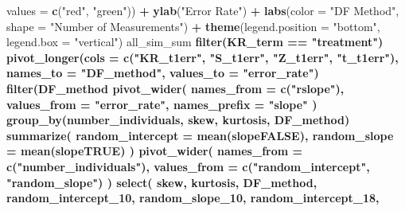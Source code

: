 \documentclass[12pt, twoside]{amherstthesis}
\newenvironment{Shaded}{\begin{snugshade}}{\end{snugshade}}
\newcommand{\DataTypeTok}[1]{\textcolor[rgb]{0.13,0.29,0.53}{#1}}
\newcommand{\DecValTok}[1]{\textcolor[rgb]{0.00,0.00,0.81}{#1}}
\newcommand{\KeywordTok}[1]{\textcolor[rgb]{0.13,0.29,0.53}{\textbf{#1}}}
\newcommand{\NormalTok}[1]{#1}
\newcommand{\OperatorTok}[1]{\textcolor[rgb]{0.81,0.36,0.00}{\textbf{#1}}}
\newcommand{\StringTok}[1]{\textcolor[rgb]{0.31,0.60,0.02}{#1}}
\begin{document}
\begin{Shaded}
\begin{Highlighting}[]
{{{{{{{{{{{{{{{                     \DataTypeTok{values =} \KeywordTok{c}\NormalTok{(}\StringTok{"red"}\NormalTok{, }\StringTok{"green"}\NormalTok{)) }\OperatorTok{+}
\StringTok{  }\KeywordTok{ylab}\NormalTok{(}\StringTok{"Error Rate"}\NormalTok{) }\OperatorTok{+}
\StringTok{  }\KeywordTok{labs}\NormalTok{(}\DataTypeTok{color =} \StringTok{"DF Method"}\NormalTok{, }\DataTypeTok{shape =} \StringTok{"Number of Measurements"}\NormalTok{) }\OperatorTok{+}
\StringTok{  }\KeywordTok{theme}\NormalTok{(}\DataTypeTok{legend.position =} \StringTok{"bottom"}\NormalTok{, }\DataTypeTok{legend.box =} \StringTok{"vertical"}\NormalTok{)}
\NormalTok{all_sim_sum }\OperatorTok{%>%}
\StringTok{  }\KeywordTok{filter}\NormalTok{(KR_term }\OperatorTok{==}\StringTok{ "treatment"}\NormalTok{) }\OperatorTok{%>%}
\StringTok{  }\KeywordTok{pivot_longer}\NormalTok{(}\DataTypeTok{cols =} \KeywordTok{c}\NormalTok{(}\StringTok{"KR_t1err"}\NormalTok{, }\StringTok{"S_t1err"}\NormalTok{, }\StringTok{"Z_t1err"}\NormalTok{, }\StringTok{"t_t1err"}\NormalTok{), }
               \DataTypeTok{names_to =} \StringTok{"DF_method"}\NormalTok{, }\DataTypeTok{values_to =} \StringTok{"error_rate"}\NormalTok{) }\OperatorTok{%>%}
\StringTok{  }\KeywordTok{filter}\NormalTok{(DF_method }\OperatorTok{%in%}\StringTok{ }\KeywordTok{c}\NormalTok{(}\StringTok{"KR_t1err"}\NormalTok{, }\StringTok{"S_t1err"}\NormalTok{)) }\OperatorTok{%>%}
\StringTok{  }\KeywordTok{pivot_wider}\NormalTok{(}
    \DataTypeTok{names_from =} \KeywordTok{c}\NormalTok{(}\StringTok{"rslope"}\NormalTok{),}
    \DataTypeTok{values_from =} \StringTok{"error_rate"}\NormalTok{, }\DataTypeTok{names_prefix =} \StringTok{"slope"}
\NormalTok{  ) }\OperatorTok{%>%}
\StringTok{  }\KeywordTok{group_by}\NormalTok{(number_individuals, skew, kurtosis, DF_method) }\OperatorTok{%>%}
\StringTok{  }\KeywordTok{summarize}\NormalTok{(}
    \DataTypeTok{random_intercept =} \KeywordTok{mean}\NormalTok{(slopeFALSE),}
    \DataTypeTok{random_slope =} \KeywordTok{mean}\NormalTok{(slopeTRUE)}
\NormalTok{  ) }\OperatorTok{%>%}
\StringTok{  }\KeywordTok{pivot_wider}\NormalTok{(}
    \DataTypeTok{names_from =} \KeywordTok{c}\NormalTok{(}\StringTok{"number_individuals"}\NormalTok{),}
    \DataTypeTok{values_from =} \KeywordTok{c}\NormalTok{(}\StringTok{"random_intercept"}\NormalTok{, }\StringTok{"random_slope"}\NormalTok{)}
\NormalTok{  ) }\OperatorTok{%>%}
\StringTok{  }\KeywordTok{select}\NormalTok{(}
\NormalTok{    skew, kurtosis, DF_method, random_intercept_}\DecValTok{10}\NormalTok{, random_slope_}\DecValTok{10}\NormalTok{, }
\NormalTok{    random_intercept_}\DecValTok{18}\NormalTok{,}
}}}}}}}}}}}}}}}}}}}}}}}
\end{Highlighting}
\end{Shaded}
\end{document}
